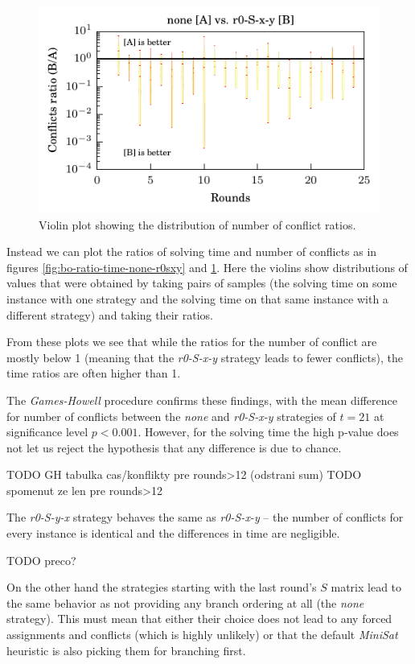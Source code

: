 \begin{figure}
\centering \includegraphics{figures/bo-ex1/ratio-confl-none-r0sxy.pdf}
\caption{Violin plot showing the distribution of number of conflict ratios.}
\label{fig:bo-ratio-confl-none-r0sxy}
\end{figure}


Instead we can plot the ratios of solving time and number of conflicts as in figures \ref{fig:bo-ratio-time-none-r0sxy} and \ref{fig:bo-ratio-confl-none-r0sxy}.
Here the violins show distributions of values that were obtained by taking pairs of samples (the solving time on some instance with one strategy and the solving time on that same instance with a different strategy) and taking their ratios.

From these plots we see that while the ratios for the number of conflict are mostly below 1 (meaning that the \emph{r0-S-x-y} strategy leads to fewer conflicts), the time ratios are often higher than 1.

The \emph{Games-Howell} procedure confirms these findings, with the mean difference for number of conflicts between the \emph{none} and \emph{r0-S-x-y} strategies of $t = 21$ at significance level $p < 0.001$.
However, for the solving time the high p-value does not let us reject the hypothesis that any difference is due to chance.

TODO GH tabulka cas/konflikty pre rounds>12 (odstrani sum)
TODO spomenut ze len pre rounds>12

The \emph{r0-S-y-x} strategy behaves the same as \emph{r0-S-x-y} -- the number of conflicts for every instance is identical and the differences in time are negligible.

TODO preco?

On the other hand the strategies starting with the last round's $S$ matrix lead to the same behavior as not providing any branch ordering at all (the \emph{none} strategy).
This must mean that either their choice does not lead to any forced assignments and conflicts (which is highly unlikely) or that the default \emph{MiniSat} heuristic is also picking them for branching first.

